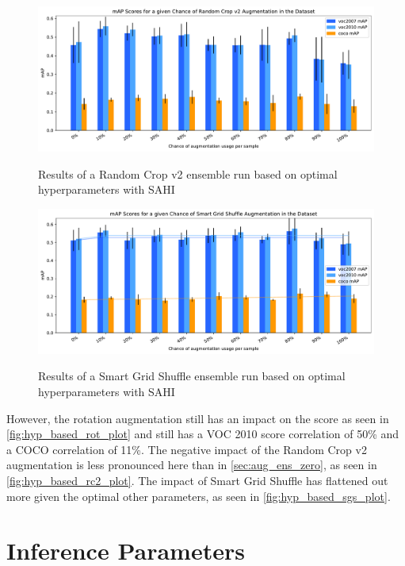 \documentclass[10pt]{book}
\begin{document}
\begin{figure}
  \caption{Results of a Random Crop v2 ensemble run based on optimal hyperparameters with \ac{SAHI}}
  \includegraphics[width=\textwidth]{image/hyp-based-rc2-sahi-ensemble-2-thesis}
  \label{fig:hyp_based_rc2_plot}
\end{figure}

\begin{figure}
  \caption{Results of a Smart Grid Shuffle ensemble run based on optimal hyperparameters with \ac{SAHI}}
  \includegraphics[width=\textwidth]{image/hyp-based-sgs-sahi-ensemble-2-thesis}
  \label{fig:hyp_based_sgs_plot}
\end{figure}

However, the rotation augmentation still has an impact on the score as seen in \autoref{fig:hyp_based_rot_plot} and still has a VOC 2010 score correlation of 50\% and a \ac{COCO} correlation of 11\%. The negative impact of the Random Crop v2 augmentation is less pronounced here than in \autoref{sec:aug_ens_zero}, as seen in \autoref{fig:hyp_based_rc2_plot}. The impact of Smart Grid Shuffle has flattened out more given the optimal other parameters, as seen in \autoref{fig:hyp_based_sgs_plot}.

\section{Inference Parameters}
\label{sec:inference_params}
\end{document}
